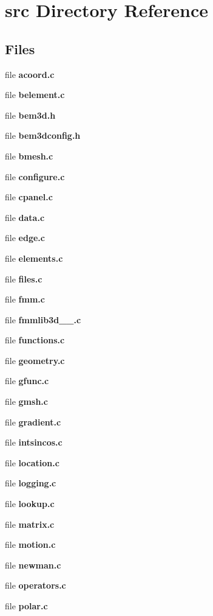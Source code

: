 \section{src Directory Reference}
\label{dir_68267d1309a1af8e8297ef4c3efbcdba}
\subsection*{Files}
\begin{DoxyCompactItemize}
\item 
file {\bfseries acoord.\+c}
\item 
file {\bfseries belement.\+c}
\item 
file {\bfseries bem3d.\+h}
\item 
file {\bfseries bem3dconfig.\+h}
\item 
file {\bfseries bmesh.\+c}
\item 
file {\bfseries configure.\+c}
\item 
file {\bfseries cpanel.\+c}
\item 
file {\bfseries data.\+c}
\item 
file {\bfseries edge.\+c}
\item 
file {\bfseries elements.\+c}
\item 
file {\bfseries files.\+c}
\item 
file {\bfseries fmm.\+c}
\item 
file {\bfseries fmmlib3d\+\_\+\_.\+c}
\item 
file {\bfseries functions.\+c}
\item 
file {\bfseries geometry.\+c}
\item 
file {\bfseries gfunc.\+c}
\item 
file {\bfseries gmsh.\+c}
\item 
file {\bfseries gradient.\+c}
\item 
file {\bfseries intsincos.\+c}
\item 
file {\bfseries location.\+c}
\item 
file {\bfseries logging.\+c}
\item 
file {\bfseries lookup.\+c}
\item 
file {\bfseries matrix.\+c}
\item 
file {\bfseries motion.\+c}
\item 
file {\bfseries newman.\+c}
\item 
file {\bfseries operators.\+c}
\item 
file {\bfseries polar.\+c}
\item 

\end{DoxyCompactItemize}
